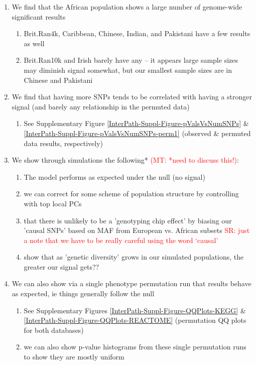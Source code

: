 \documentclass[12pt, a4paper]{article}
\newcommand{\red}[1]{\textcolor{red}{#1}}
\begin{document}
\begin{enumerate}
\begin{enumerate}
        \item We find that the African population shows a large number of genome-wide significant results
        \begin{enumerate}
            \item Brit.Ran4k, Caribbean, Chinese, Indian, and Pakistani have a few results as well
            \item Brit.Ran10k and Irish barely have any -- it appears large sample sizes may diminish signal somewhat, but our smallest sample sizes are in Chinese and Pakistani
        \end{enumerate}
        \item We find that having more SNPs tends to be correlated with having a stronger signal (and barely any relationship in the permuted data)
        \begin{enumerate}
            \item See Supplementary Figure \ref{InterPath-Suppl-Figure-pValsVsNumSNPs} \& \ref{InterPath-Suppl-Figure-pValsVsNumSNPs-perm1} (observed \& permuted data results, respectively)
        \end{enumerate}
        \item We show through simulations the following* \red{(MT: *need to discuss this!)}:
        \begin{enumerate}
            \item The model performs as expected under the null (no signal)
            \item we can correct for some scheme of population structure by controlling with top local PCs
            \item that there is unlikely to be a 'genotyping chip effect' by biasing our 'causal SNPs' based on MAF from European vs. African subsets \red{SR: just a note that we have to be really careful using the word `causal'}
            \item show that as 'genetic diversity' grows in our simulated populations, the greater our signal gets??
        \end{enumerate}
        \item We can also show via a single phenotype permutation run that results behave as expected, ie things generally follow the null
        \begin{enumerate}
            \item See Supplementary Figures \ref{InterPath-Suppl-Figure-QQPlots-KEGG} \& \ref{InterPath-Suppl-Figure-QQPlots-REACTOME} (permutation QQ plots for both databases)
            \item we can also show p-value histograms from these single permutation runs to show they are mostly uniform

\end{enumerate}
\end{enumerate}
\end{enumerate}
\end{document}
